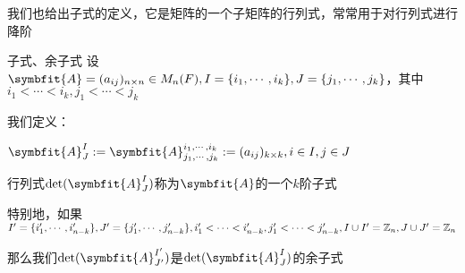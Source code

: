 \documentclass[12pt, a4paper, oneside, UTF8]{ctexbook}
\begin{document}
			我们也给出子式的定义，它是矩阵的一个子矩阵的行列式，常常用于对行列式进行降阶
			\begin{defn}{子式、余子式}{}
				设$\symbfit{A}=(a_{ij})_{n\times n} \in M_n(F),I=\{i_1,\cdots,i_k\},J=\{j_1,\cdots,j_k\}$，其中$i_1 < \cdots < i_k,j_1 < \cdots < j_k$

				我们定义：

				$\symbfit{A}_J^I:=\symbfit{A}_{j_1,\cdots,j_k}^{i_1,\cdots,i_k}:=(a_{ij})_{k\times k},i \in I,j \in J$

				行列式$\det(\symbfit{A}_J^I)$称为$\symbfit{A}$的一个$k$阶子式

				特别地，如果$I'=\{i_1',\cdots,i_{n-k}'\},J'=\{j_1',\cdots,j_{n-k}'\},i_1'<\cdots<i_{n-k}',j_1'<\cdots<j_{n-k}',I \cup I'=\mathbb{Z}_n,J\cup J'=\mathbb{Z}_n$
					
				那么我们$\det(\symbfit{A}_{J'}^{I'})$是$\det(\symbfit{A}_{J}^{I})$的余子式
			\end{defn}
\end{document}
